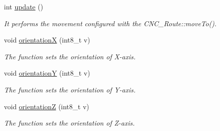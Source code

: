 \begin{DoxyCompactItemize}
int \hyperlink{class_c_n_c___router_ad67d003f8bb12c60f9752126d47408f6}{update} ()
\begin{DoxyCompactList}\small\item\em It performs the movement configured with the C\+N\+C\+\_\+\+Route\+::move\+To(). \end{DoxyCompactList}\item 
void \hyperlink{class_c_n_c___router_adef23983c5aac16fa0431f861eb41fc2}{orientation\+X} (int8\+\_\+t v)
\begin{DoxyCompactList}\small\item\em The function sets the orientation of X-\/axis. \end{DoxyCompactList}\item 
void \hyperlink{class_c_n_c___router_abced37562004a4b303291be79e49a23b}{orientation\+Y} (int8\+\_\+t v)
\begin{DoxyCompactList}\small\item\em The function sets the orientation of Y-\/axis. \end{DoxyCompactList}\item 
void \hyperlink{class_c_n_c___router_a7dc30b35ae89245b4b8f53a0777472a5}{orientation\+Z} (int8\+\_\+t v)
\begin{DoxyCompactList}\small\item\em The function sets the orientation of Z-\/axis. \end{DoxyCompactList}\end{DoxyCompactItemize}
